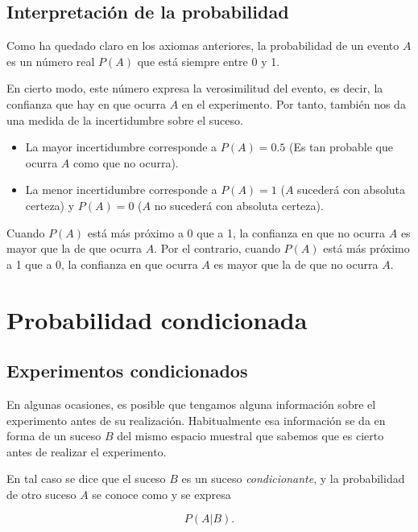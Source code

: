\documentclass[
  a4paper,
]{scrreport}
\theoremstyle{plain}
\theoremstyle{definition}
\theoremstyle{definition}
\theoremstyle{remark}
\begin{document}
\subsection{Interpretación de la
probabilidad}\label{interpretaciuxf3n-de-la-probabilidad}

Como ha quedado claro en los axiomas anteriores, la probabilidad de un
evento \(A\) es un número real \(P(A)\) que está siempre entre 0 y 1.

En cierto modo, este número expresa la verosimilitud del evento, es
decir, la confianza que hay en que ocurra \(A\) en el experimento. Por
tanto, también nos da una medida de la incertidumbre sobre el suceso.

\begin{itemize}
\item
  La mayor incertidumbre corresponde a \(P(A)=0.5\) (Es tan probable que
  ocurra \(A\) como que no ocurra).
\item
  La menor incertidumbre corresponde a \(P(A)=1\) (\(A\) sucederá con
  absoluta certeza) y \(P(A)=0\) (\(A\) no sucederá con absoluta
  certeza).
\end{itemize}

Cuando \(P(A)\) está más próximo a 0 que a 1, la confianza en que no
ocurra \(A\) es mayor que la de que ocurra \(A\). Por el contrario,
cuando \(P(A)\) está más próximo a 1 que a 0, la confianza en que ocurra
\(A\) es mayor que la de que no ocurra \(A\).

\section{Probabilidad condicionada}\label{probabilidad-condicionada}

\subsection{Experimentos
condicionados}\label{experimentos-condicionados}

En algunas ocasiones, es posible que tengamos alguna información sobre
el experimento antes de su realización. Habitualmente esa información se
da en forma de un suceso \(B\) del mismo espacio muestral que sabemos
que es cierto antes de realizar el experimento.

En tal caso se dice que el suceso \(B\) es un suceso
\emph{condicionante}, y la probabilidad de otro suceso \(A\) se conoce
como y se expresa

\[P(A|B).\]
\end{document}
